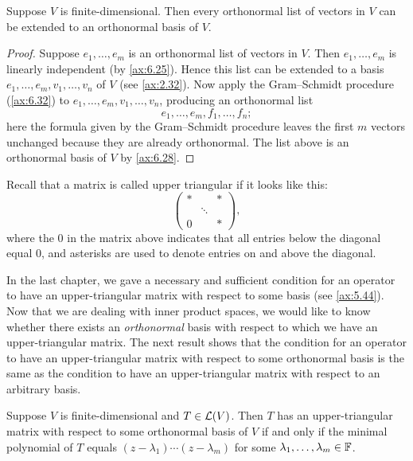 \begin{result}\label{ax:6.36}
Suppose $V$ is finite-dimensional. Then every orthonormal list of vectors in $V$
can be extended to an orthonormal basis of $V$.
\end{result}

\begin{proof}
Suppose $e_1,\dots,e_m$ is an orthonormal list of vectors in $V$. Then
$e_1,\dots,e_m$ is linearly independent (by \ref{ax:6.25}). Hence this list can
be extended to a basis $e_1,\dots,e_m,v_1,\dots,v_n$ of $V$ (see
\ref{ax:2.32}). Now apply the Gram--Schmidt procedure (\ref{ax:6.32}) to
$e_1,\dots,e_m,v_1,\dots,v_n$, producing an orthonormal list
\[ e_1,\dots,e_m,f_1,\dots,f_n; \]
here the formula given by the Gram--Schmidt procedure leaves the first $m$
vectors unchanged because they are already orthonormal. The list above is an
orthonormal basis of $V$ by \ref{ax:6.28}.
\end{proof}

Recall that a matrix is called upper triangular if it looks like this:
\[ \begin{pmatrix} * & & *\\ & \ddots & \\ 0 & & * \end{pmatrix}, \]
where the $0$ in the matrix above indicates that all entries below the diagonal
equal $0$, and asterisks are used to denote entries on and above the diagonal.

In the last chapter, we gave a necessary and sufficient condition for an
operator to have an upper-triangular matrix with respect to some basis (see
\ref{ax:5.44}). Now that we are dealing with inner product spaces, we would like
to know whether there exists an \emph{orthonormal} basis with respect to which
we have an upper-triangular matrix. The next result shows that the condition for
an operator to have an upper-triangular matrix with respect to some orthonormal
basis is the same as the condition to have an upper-triangular matrix with
respect to an arbitrary basis.

\begin{result}\label{ax:6.37}
Suppose $V$ is finite-dimensional and $T\in\mathcal{L}(V)$. Then $T$ has an
upper-triangular matrix with respect to some orthonormal basis of $V$ if and
only if the minimal polynomial of $T$ equals $(z-\lambda_1)\cdots(z-\lambda_m)$
for some $\lambda_1,\dots,\lambda_m\in\mathbb{F}$.
\end{result}


